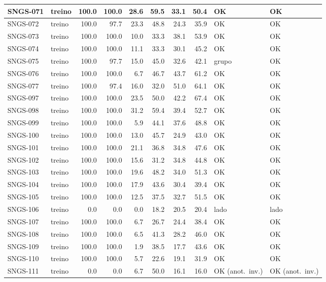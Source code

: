 \begin{small}
\begin{longtable}{|l|l|r|r|r|r|r|r|l|l|}
SNGS-071 & treino & 100.0 & 100.0 & 28.6 & 59.5 & 33.1 & 50.4 & OK & OK \\ \hline
SNGS-072 & treino & 100.0 & 97.7 & 23.3 & 48.8 & 24.3 & 35.9 & OK & OK \\ \hline
SNGS-073 & treino & 100.0 & 100.0 & 10.0 & 33.3 & 38.1 & 53.9 & OK & OK \\ \hline
SNGS-074 & treino & 100.0 & 100.0 & 11.1 & 33.3 & 30.1 & 45.2 & OK & OK \\ \hline
SNGS-075 & treino & 100.0 & 97.7 & 15.0 & 45.0 & 32.6 & 42.1 & grupo & OK \\ \hline
SNGS-076 & treino & 100.0 & 100.0 & 6.7 & 46.7 & 43.7 & 61.2 & OK & OK \\ \hline
SNGS-077 & treino & 100.0 & 97.4 & 16.0 & 32.0 & 51.0 & 64.1 & OK & OK \\ \hline
SNGS-097 & treino & 100.0 & 100.0 & 23.5 & 50.0 & 42.2 & 67.4 & OK & OK \\ \hline
SNGS-098 & treino & 100.0 & 100.0 & 31.2 & 59.4 & 39.4 & 52.7 & OK & OK \\ \hline
SNGS-099 & treino & 100.0 & 100.0 & 5.9 & 44.1 & 37.6 & 48.8 & OK & OK \\ \hline
SNGS-100 & treino & 100.0 & 100.0 & 13.0 & 45.7 & 24.9 & 43.0 & OK & OK \\ \hline
SNGS-101 & treino & 100.0 & 100.0 & 21.1 & 36.8 & 34.8 & 47.6 & OK & OK \\ \hline
SNGS-102 & treino & 100.0 & 100.0 & 15.6 & 31.2 & 34.8 & 44.8 & OK & OK \\ \hline
SNGS-103 & treino & 100.0 & 100.0 & 19.6 & 48.2 & 34.0 & 51.3 & OK & OK \\ \hline
SNGS-104 & treino & 100.0 & 100.0 & 17.9 & 43.6 & 30.4 & 39.4 & OK & OK \\ \hline
SNGS-105 & treino & 100.0 & 100.0 & 12.5 & 37.5 & 32.7 & 51.5 & OK & OK \\ \hline
SNGS-106 & treino & 0.0 & 0.0 & 0.0 & 18.2 & 20.5 & 20.4 & lado & lado \\ \hline
SNGS-107 & treino & 100.0 & 100.0 & 6.7 & 26.7 & 24.4 & 38.4 & OK & OK \\ \hline
SNGS-108 & treino & 100.0 & 100.0 & 6.5 & 41.3 & 28.2 & 46.0 & OK & OK \\ \hline
SNGS-109 & treino & 100.0 & 100.0 & 1.9 & 38.5 & 17.7 & 43.6 & OK & OK \\ \hline
SNGS-110 & treino & 100.0 & 100.0 & 5.7 & 22.6 & 19.1 & 31.9 & OK & OK \\ \hline
SNGS-111 & treino & 0.0 & 0.0 & 6.7 & 50.0 & 16.1 & 16.0 & OK (anot.\ inv.) & OK (anot.\ inv.) \\ \hline

\end{longtable}
\end{small}
